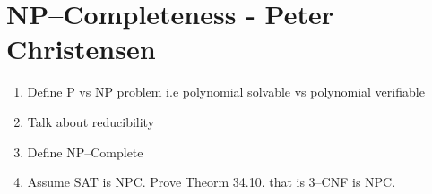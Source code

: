 \section*{NP--Completeness - Peter Christensen}

\begin{enumerate}
	\item Define P vs NP problem i.e polynomial solvable vs polynomial verifiable
	\item Talk about reducibility
	\item Define NP--Complete
	\item Assume SAT is NPC. Prove Theorm 34.10. that is 3--CNF is NPC.
\end{enumerate}